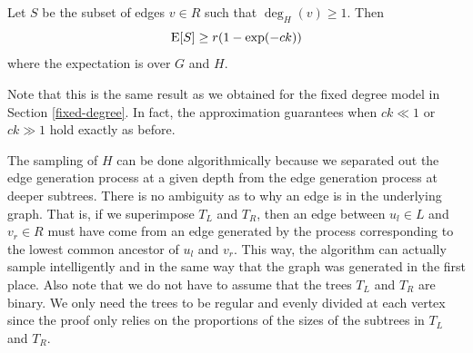 \begin{thm}
Let $S$ be the subset of edges $v\in R$ such that $\deg_H(v) \geq 1$. Then
\[ \text{E}[S] \geq r(1-\exp(-ck)) \]
where the expectation is over $G$ and $H$.
\end{thm}

%
%

Note that this is the same result as we obtained for the fixed degree
model in Section \ref{fixed-degree}. In fact, the approximation
guarantees when $ck \ll 1$ or $ck \gg 1$ hold exactly as before.\vs

The sampling of $H$ can be done algorithmically because we separated
out the edge generation process at a given depth from the edge
generation process at deeper subtrees. There is no ambiguity as to why
an edge is in the underlying graph. That is, if we superimpose $T_L$
and $T_R$, then an edge between $u_l\in L$ and $v_r\in R$ must have
come from an edge generated by the process corresponding to the lowest common ancestor of $u_l$ and $v_r$. This way, the algorithm can actually sample intelligently and in the same way that the graph was generated in the first place. Also note
that we do not have to assume that the trees $T_L$ and $T_R$ are
binary. We only need the trees to be regular and evenly divided at
each vertex since the proof only relies on the proportions of the
sizes of the subtrees in $T_L$ and $T_R$.


